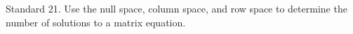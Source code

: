 Standard 21.	Use the null space, column space, and row space to determine the number of solutions to a matrix equation.



\ifprintanswers
\else %
 \newpage
\fi

\begin{solution}
    
\end{solution}